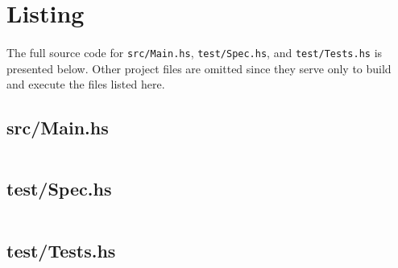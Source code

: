 \documentclass{article}
\begin{document}
\section*{Listing}

\paragraph{}
The full source code for \texttt{src/Main.hs}, \texttt{test/Spec.hs}, and \texttt{test/Tests.hs} is presented below. Other project files are omitted since they serve only to build and execute the files listed here.

\subsection*{src/Main.hs}

\inputminted[fontfamily=tt, fontsize=\small, linenos=true, stepnumber=5, breaklines=true]{haskell}{../cs421-project-erick2/src/Main.hs}

\subsection*{test/Spec.hs}

\inputminted[fontfamily=tt, fontsize=\small, linenos=true, stepnumber=5, breaklines=true]{haskell}{../cs421-project-erick2/test/Spec.hs}

\subsection*{test/Tests.hs}

\inputminted[fontfamily=tt, fontsize=\small, linenos=true, stepnumber=5, breaklines=true]{haskell}{../cs421-project-erick2/test/Tests.hs}
\end{document}

